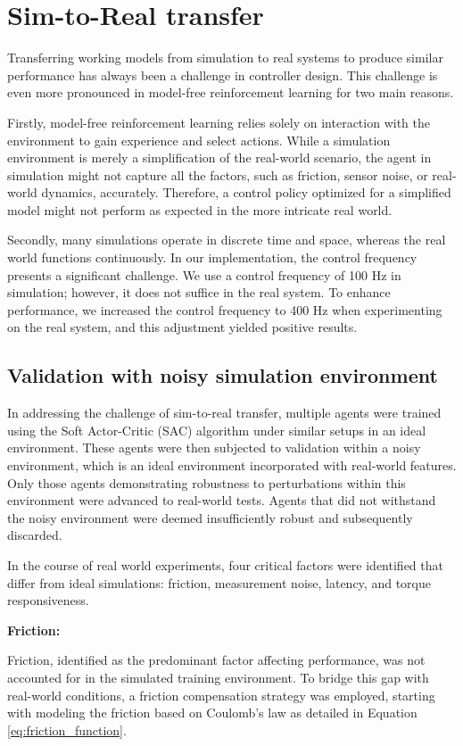 \section{Sim-to-Real transfer}
Transferring working models from simulation to real systems to produce similar performance has always been a challenge in controller design. This challenge is even more pronounced in model-free reinforcement learning for two main reasons.

Firstly, model-free reinforcement learning relies solely on interaction with the environment to gain experience and select actions. While a simulation environment is merely a simplification of the real-world scenario, the agent in simulation might not capture all the factors, such as friction, sensor noise, or real-world dynamics, accurately. Therefore, a control policy optimized for a simplified model might not perform as expected in the more intricate real world.

Secondly, many simulations operate in discrete time and space, whereas the real world functions continuously. In our implementation, the control frequency presents a significant challenge. We use a control frequency of 100 Hz in simulation; however, it does not suffice in the real system. To enhance performance, we increased the control frequency to 400 Hz when experimenting on the real system, and this adjustment yielded positive results.

\subsection{Validation with noisy simulation environment}
In addressing the challenge of sim-to-real transfer, multiple agents were trained using the Soft Actor-Critic (SAC) algorithm under similar setups in an ideal environment. These agents were then subjected to validation within a noisy environment, which is an ideal environment incorporated with real-world features. Only those agents demonstrating robustness to perturbations within this environment were advanced to real-world tests. Agents that did not withstand the noisy environment were deemed insufficiently robust and subsequently discarded.

In the course of real world experiments, four critical factors were identified that differ from ideal simulations: friction, measurement noise, latency, and torque responsiveness.

\textbf{Friction:}

Friction, identified as the predominant factor affecting performance, was not accounted for in the simulated training environment. To bridge this gap with real-world conditions, a friction compensation strategy was employed, starting with modeling the friction based on Coulomb’s law as detailed in Equation \ref{eq:friction_function}. 

